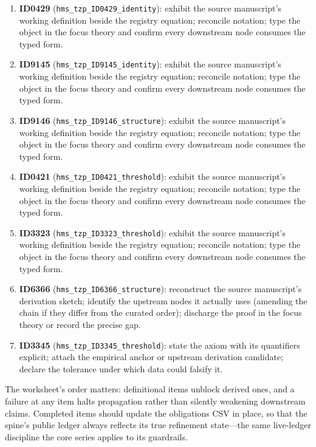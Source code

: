 \documentclass[11pt]{article}
\theoremstyle{remark}
\begin{document}
\begin{enumerate}
\item \textbf{ID0429} (\texttt{hms\_tzp\_ID0429\_identity}): exhibit the source manuscript's working definition beside the registry equation; reconcile notation; type the object in the focus theory and confirm every downstream node consumes the typed form.
\item \textbf{ID9145} (\texttt{hms\_tzp\_ID9145\_identity}): exhibit the source manuscript's working definition beside the registry equation; reconcile notation; type the object in the focus theory and confirm every downstream node consumes the typed form.
\item \textbf{ID9146} (\texttt{hms\_tzp\_ID9146\_structure}): exhibit the source manuscript's working definition beside the registry equation; reconcile notation; type the object in the focus theory and confirm every downstream node consumes the typed form.
\item \textbf{ID0421} (\texttt{hms\_tzp\_ID0421\_threshold}): exhibit the source manuscript's working definition beside the registry equation; reconcile notation; type the object in the focus theory and confirm every downstream node consumes the typed form.
\item \textbf{ID3323} (\texttt{hms\_tzp\_ID3323\_threshold}): exhibit the source manuscript's working definition beside the registry equation; reconcile notation; type the object in the focus theory and confirm every downstream node consumes the typed form.
\item \textbf{ID6366} (\texttt{hms\_tzp\_ID6366\_structure}): reconstruct the source manuscript's derivation sketch; identify the upstream nodes it actually uses (amending the chain if they differ from the curated order); discharge the proof in the focus theory or record the precise gap.
\item \textbf{ID3345} (\texttt{hms\_tzp\_ID3345\_threshold}): state the axiom with its quantifiers explicit; attach the empirical anchor or upstream derivation candidate; declare the tolerance under which data could falsify it.
\end{enumerate}

The worksheet's order matters: definitional items unblock derived ones, and a failure at any item halts propagation rather than silently weakening downstream claims. Completed items should update the obligations CSV in place, so that the spine's public ledger always reflects its true refinement state---the same live-ledger discipline the core series applies to its guardrails.
\end{document}
